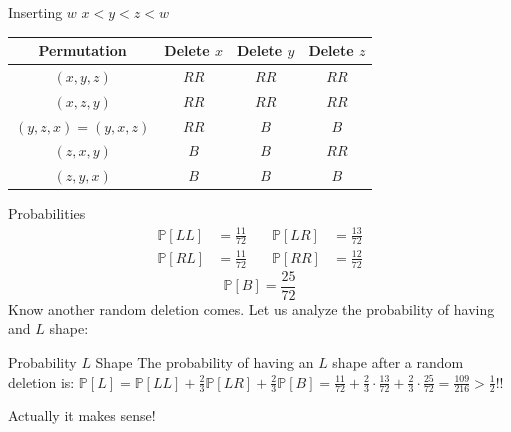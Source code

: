 \documentclass{beamer}
\begin{document}
\begin{frame}{Inserting $w$}
    $x < y < z < w$
    \begin{center}
        \begin{tabular}{||c c c c||} 
            \hline
            Permutation& Delete $x$& Delete $y$ & Delete $z$ \\ [0.5ex] 
            \hline\hline
            $(x,y,z)$ & $RR$ & $RR$ & $RR$ \\ 
            \hline
            $(x,z,y)$ & $RR$ & $RR$ & $RR$ \\  
            \hline
            $(y,z,x) = (y,x,z)$ & $RR$ & $B$ & $B$\\ 
            \hline
            $(z,x,y)$ & $B$ & $B$ & $RR$\\ 
            \hline
            $(z,y,x)$ & $B$ & $B$ & $B$ \\ 
            \hline
        \end{tabular}
    \end{center}
\end{frame}

\begin{frame}{Probabilities}
    \begin{align*}
        \mathbb{P}[LL] &= \frac{11}{72} & \quad \mathbb{P}[LR] &= \frac{13}{72} \\
        \mathbb{P}[RL] &= \frac{11}{72} & \quad \mathbb{P}[RR] &= \frac{12}{72}
    \end{align*}
        $$
        \mathbb{P}[B] = \frac{25}{72}
        $$
        Know another random deletion comes. Let us analyze the probability of having and $L$ shape:
    \pause
    \begin{block}{Probability $L$ Shape}
        The probability of having an $L$ shape after a random deletion is: $\mathbb{P}[L] = \mathbb{P}[LL] + \frac{2}{3}  \mathbb{P}[LR] + \frac{2}{3} \mathbb{P}[B] = \frac{11}{72} + \frac{2}{3} \cdot \frac{13}{72} + \frac{2}{3} \cdot \frac{25}{72} = \frac{109}{216} > \frac{1}{2}$!!
    \end{block}
    \pause
    Actually it makes sense! 
\end{frame}
\end{document}
